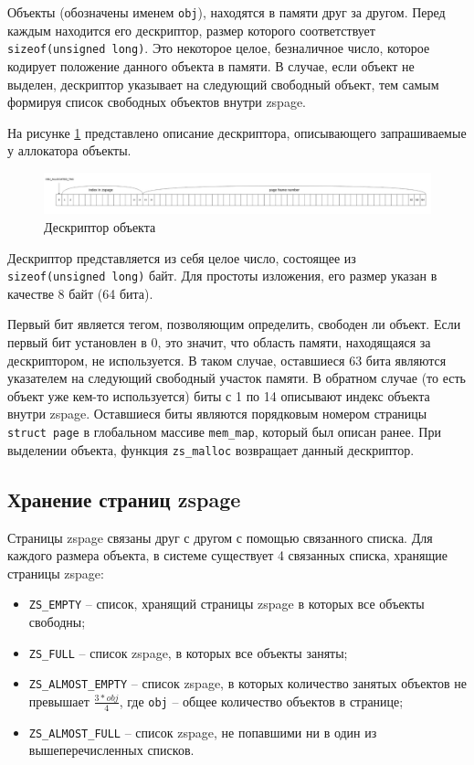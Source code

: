 Объекты (обозначены именем \texttt{obj}), находятся в памяти друг за другом. Перед каждым находится его дескриптор, размер которого соответствует\\ \texttt{sizeof(unsigned long)}. Это некоторое целое, безналичное число, которое кодирует положение данного объекта в памяти. В случае, если объект не выделен, дескриптор указывает на следующий свободный объект, тем самым формируя список свободных объектов внутри zspage. 

На рисунке \ref{fig:handle} представлено описание дескриптора, описывающего запрашиваемые у аллокатора объекты. 

\begin{figure}[h]
	\centering
	\includegraphics[width=\textwidth]{img/handle.png}
	\caption{Дескриптор объекта}
	\label{fig:handle}
\end{figure}

Дескриптор представляется из себя целое число, состоящее из \\ \texttt{sizeof(unsigned long)} байт. Для простоты изложения, его размер указан в качестве 8 байт (64 бита). 

Первый бит является тегом, позволяющим определить, свободен ли объект. Если первый бит установлен в 0, это значит, что область памяти, находящаяся за дескриптором, не используется. В таком случае, оставшиеся 63 бита являются указателем на следующий свободный участок памяти. В обратном случае (то есть объект уже кем-то используется) биты с 1 по 14 описывают индекс объекта внутри zspage. Оставшиеся биты являются порядковым номером страницы \texttt{struct page} в глобальном массиве \texttt{mem\_map}, который был описан ранее. При выделении объекта, функция \texttt{zs\_malloc} возвращает данный дескриптор.

\subsection{Хранение страниц zspage}

Страницы zspage связаны друг с другом с помощью связанного списка. Для каждого размера объекта, в системе существует 4 связанных списка, хранящие страницы zspage:

\begin{itemize}
	\item \texttt{ZS\_EMPTY} -- список, хранящий страницы zspage в которых все объекты свободны;
	\item \texttt{ZS\_FULL} -- список zspage, в которых все объекты заняты;
	\item \texttt{ZS\_ALMOST\_EMPTY} -- список zspage, в которых количество занятых объектов не превышает $\frac{3 * obj}{4}$, где \texttt{obj} -- общее количество объектов в странице;
	\item \texttt{ZS\_ALMOST\_FULL} -- список zspage, не попавшими ни в один из вышеперечисленных списков.
\end{itemize}

